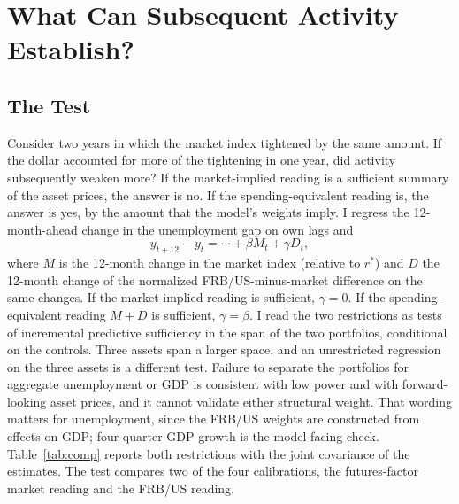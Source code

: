 \documentclass[11pt]{article}
\begin{document}

\FloatBarrier

\section{What Can Subsequent Activity Establish?}\label{sec:outlook}
\subsection{The Test}\label{sec:onetest}
Consider two years in which the market index tightened by the same amount. If the dollar accounted for more of the tightening in one year, did activity subsequently weaken more? If the market-implied reading is a sufficient summary of the asset prices, the answer is no. If the spending-equivalent reading is, the answer is yes, by the amount that the model's weights imply. I regress the 12-month-ahead change in the unemployment gap on own lags and
\begin{equation}\label{eq:test}
y_{t+12}-y_t=\cdots+\beta M_t+\gamma D_t ,
\end{equation}
where $M$ is the 12-month change in the market index (relative to $r^*$) and $D$ the 12-month change of the normalized FRB/US-minus-market difference on the same changes. If the market-implied reading is sufficient, $\gamma=0$. If the spending-equivalent reading $M+D$ is sufficient, $\gamma=\beta$. I read the two restrictions as tests of incremental predictive sufficiency in the span of the two portfolios, conditional on the controls. Three assets span a larger space, and an unrestricted regression on the three assets is a different test. Failure to separate the portfolios for aggregate unemployment or GDP is consistent with low power and with forward-looking asset prices, and it cannot validate either structural weight. That wording matters for unemployment, since the FRB/US weights are constructed from effects on GDP; four-quarter GDP growth is the model-facing check. Table~\ref{tab:comp} reports both restrictions with the joint covariance of the estimates. The test compares two of the four calibrations, the futures-factor market reading and the FRB/US reading.
\end{document}
